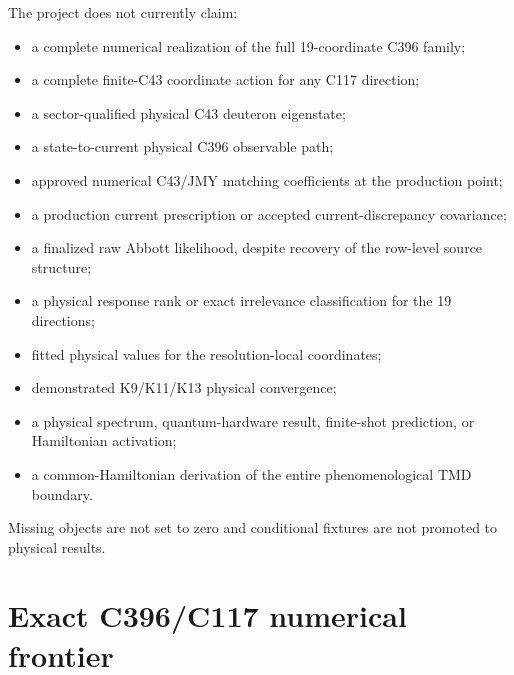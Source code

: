 \documentclass[11pt,oneside]{book}
\begin{document}
The project does not currently claim:
\begin{itemize}
 \item a complete numerical realization of the full 19-coordinate C396 family;
 \item a complete finite-C43 coordinate action for any C117 direction;
 \item a sector-qualified physical C43 deuteron eigenstate;
 \item a state-to-current physical C396 observable path;
 \item approved numerical C43/JMY matching coefficients at the production point;
 \item a production current prescription or accepted current-discrepancy covariance;
 \item a finalized raw Abbott likelihood, despite recovery of the row-level source structure;
 \item a physical response rank or exact irrelevance classification for the 19 directions;
 \item fitted physical values for the resolution-local coordinates;
 \item demonstrated K9/K11/K13 physical convergence;
 \item a physical spectrum, quantum-hardware result, finite-shot prediction, or Hamiltonian activation;
 \item a common-Hamiltonian derivation of the entire phenomenological TMD boundary.
\end{itemize}
Missing objects are not set to zero and conditional fixtures are not promoted to physical results.

\section{Exact C396/C117 numerical frontier}
\end{document}

